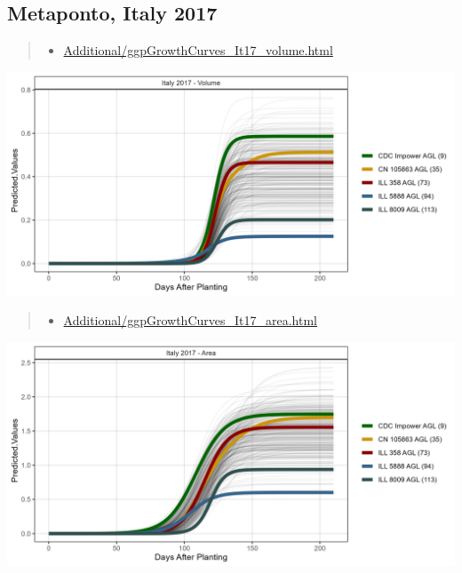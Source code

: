 \documentclass[
]{article}
\providecommand{\tightlist}{%
  \setlength{\itemsep}{0pt}\setlength{\parskip}{0pt}}
\begin{document}
\subsection{Metaponto, Italy 2017}\label{metaponto-italy-2017}

\begin{quote}
\begin{itemize}
\tightlist
\item
  \href{https://derekmichaelwright.github.io/AGILE_LDP_UAV/Additional/ggpGrowthCurves_It17_volume.html}{Additional/ggpGrowthCurves\_It17\_volume.html}
\end{itemize}
\end{quote}

\includegraphics{Additional/ggGrowthCurves_It17_volume.png}

\begin{quote}
\begin{itemize}
\tightlist
\item
  \href{https://derekmichaelwright.github.io/AGILE_LDP_UAV/Additional/ggpGrowthCurves_It17_area.html}{Additional/ggpGrowthCurves\_It17\_area.html}
\end{itemize}
\end{quote}

\includegraphics{Additional/ggGrowthCurves_It17_area.png}
\end{document}

